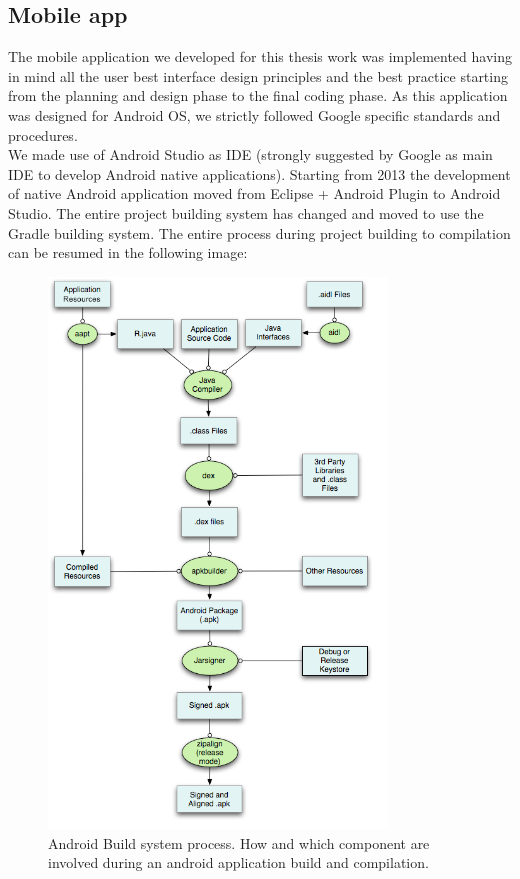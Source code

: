\subsection{Mobile app}
The mobile application we developed for this thesis work was implemented having in mind all the user best interface design principles and the best practice starting from the planning and design phase to the final  coding phase. As this application was designed for Android OS, we strictly followed Google specific standards and procedures.\\
We made use of Android Studio as IDE (strongly suggested by Google as main IDE to develop Android native applications). Starting from 2013 the development of native Android application moved from Eclipse + Android Plugin to Android Studio. The entire project building system has changed and moved to use the Gradle  building system\cite{ref23}. 
The entire process during project building to compilation can be resumed in the following image:
\begin{figure}[ht!]
	\centering
	\includegraphics[width=90mm]{figures/ch8/3.png}
	\caption{Android Build system process. How and which component are involved during an android application build and compilation.}
	\label{fig8.3}
\end{figure}
